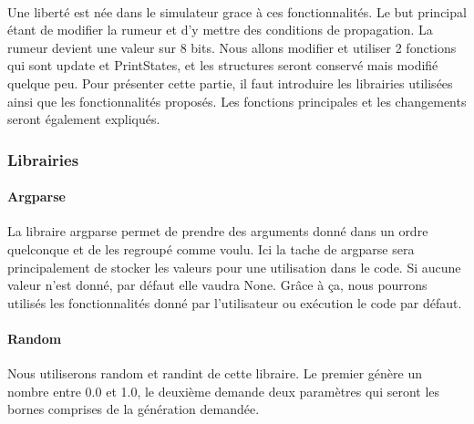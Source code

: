 \documentclass[a4paper,11pt]{article}
\begin{document}
\paragraph{}
{Une liberté est née dans le simulateur grace à ces fonctionnalités.
Le but principal étant de modifier la rumeur et d'y mettre des conditions de propagation.
La rumeur devient une valeur sur 8 bits. Nous allons modifier et utiliser 2 fonctions qui sont update et PrintStates,
et les structures seront conservé mais modifié quelque peu. Pour présenter cette partie, il faut introduire les librairies
 utilisées ainsi que les fonctionnalités proposés. Les fonctions principales et les changements seront également expliqués.}
\subsubsection{Librairies}
\paragraph{Argparse\newline}
{La libraire argparse permet de prendre des arguments donné dans un ordre quelconque et de les regroupé comme voulu.
Ici la tache de argparse sera principalement de stocker les valeurs pour une utilisation dans le code. Si aucune valeur n'est 
donné, par défaut elle vaudra None. Grâce à ça, nous pourrons utilisés les fonctionnalités donné par l'utilisateur ou 
exécution le code par défaut.}
\paragraph{Random\newline}
{Nous utiliserons random et randint de cette libraire. Le premier génère un nombre entre 0.0 et 1.0, le deuxième demande 
deux paramètres qui seront les bornes comprises de la génération demandée.}
\end{document}
